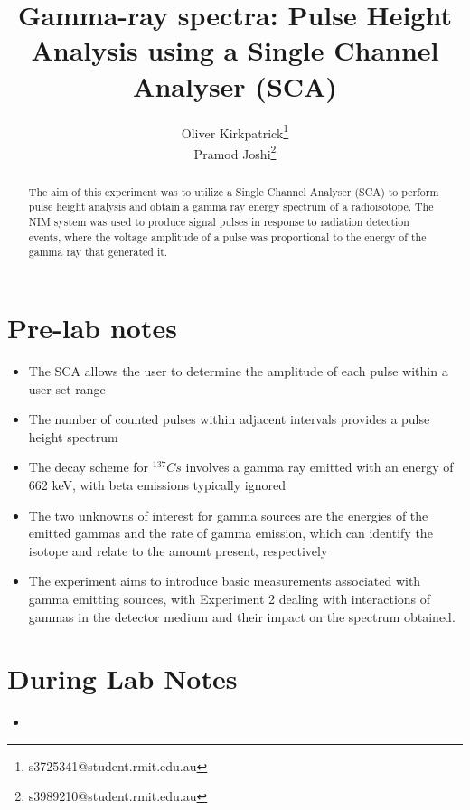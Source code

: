 \documentclass{article}
\title{Gamma-ray spectra: Pulse Height Analysis using a
Single Channel Analyser (SCA)}
\author{
    Oliver Kirkpatrick\footnote{s3725341@student.rmit.edu.au}\\
    Pramod Joshi\footnote{s3989210@student.rmit.edu.au}
}
\begin{document}
\maketitle
\begin{abstract}
    The aim of this experiment was to utilize a Single Channel Analyser (SCA) to perform pulse height analysis and obtain a gamma ray energy spectrum of a radioisotope. The NIM system was used to produce signal pulses in response to radiation detection events, where the voltage amplitude of a pulse was proportional to the energy of the gamma ray that generated it. %
\end{abstract}
\section{Pre-lab notes}
\begin{itemize}
    \item The SCA allows the user to determine the amplitude of each pulse within a user-set range
    \item The number of counted pulses within adjacent intervals provides a pulse height spectrum
    \item The decay scheme for $^{137}Cs$ involves a gamma ray emitted with an energy of 662 keV, with beta emissions typically ignored
    \item The two unknowns of interest for gamma sources are the energies of the emitted gammas and the rate of gamma emission, which can identify the isotope and relate to the amount present, respectively
    \item The experiment aims to introduce basic measurements associated with gamma emitting sources, with Experiment 2 dealing with interactions of gammas in the detector medium and their impact on the spectrum obtained.
\end{itemize}
\section{During Lab Notes}
\begin{itemize}
    \item 
\end{itemize}
\end{document}
